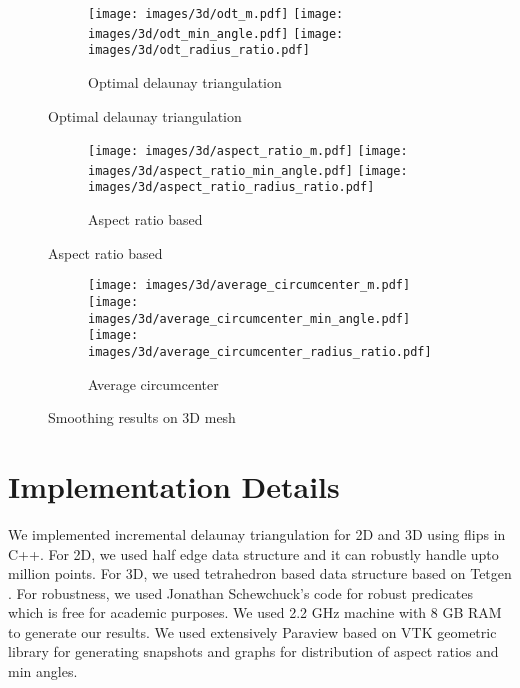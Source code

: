 \begin{figure}[H]
	\ContinuedFloat
    \centering
    \begin{subfigure}[b]{1.0\textwidth}
        \texttt{[image: images/3d/odt\_m.pdf]}
        \texttt{[image: images/3d/odt\_min\_angle.pdf]}
        \texttt{[image: images/3d/odt\_radius\_ratio.pdf]}
        \caption{Optimal delaunay triangulation}       
        \label{fig:odt_3d}        
    \end{subfigure}
\end{figure}

\begin{figure}[H]
	\ContinuedFloat
    \centering
    \begin{subfigure}[b]{1.0\textwidth}
        \texttt{[image: images/3d/aspect\_ratio\_m.pdf]}
        \texttt{[image: images/3d/aspect\_ratio\_min\_angle.pdf]}
        \texttt{[image: images/3d/aspect\_ratio\_radius\_ratio.pdf]}
        \caption{Aspect ratio based}       
        \label{fig:avg_ar_3d}
    \end{subfigure} 
\end{figure}

\begin{figure}[H]
	\ContinuedFloat
    \centering
    \begin{subfigure}[b]{1.0\textwidth}
        \texttt{[image: images/3d/average\_circumcenter\_m.pdf]}
        \texttt{[image: images/3d/average\_circumcenter\_min\_angle.pdf]}
        \texttt{[image: images/3d/average\_circumcenter\_radius\_ratio.pdf]}
        \caption{Average circumcenter}       
        \label{fig:avg_cc_3d}
    \end{subfigure}
    \caption{Smoothing results on 3D mesh}
    \label{fig:3d}
    \vspace{0.5 cm}
\end{figure}

\section{Implementation Details}
We implemented incremental delaunay triangulation for 2D and 3D using flips in C++. For 2D, we used half edge data structure and it can robustly handle upto million points.
For 3D, we used tetrahedron based data structure based on Tetgen \cite{tetgen}. For robustness, we used Jonathan Schewchuck's code for robust predicates which is free for academic purposes. We used 2.2 GHz machine with 8 GB RAM to generate our results. We used extensively Paraview based on VTK geometric library for generating  snapshots and graphs for distribution of aspect ratios and min angles.